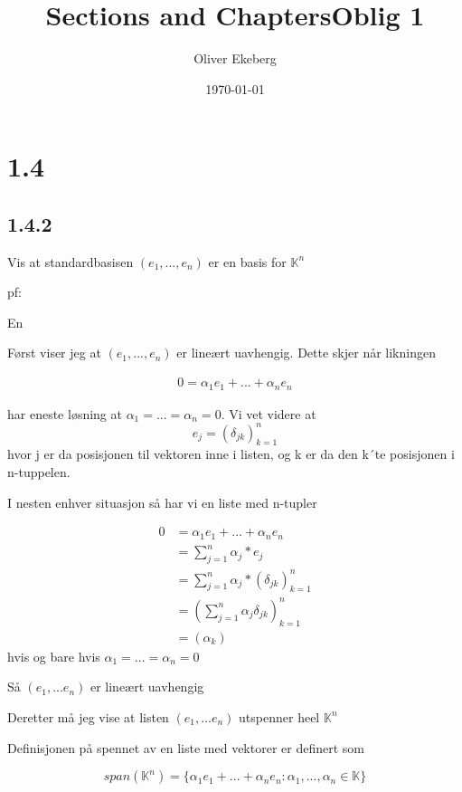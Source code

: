\documentclass[11pt]{article}
\title{Sections and Chapters}
\title{Oblig 1}
\author{Oliver Ekeberg}
\date{\today}
\begin{document}
\maketitle


\tableofcontents


\section{1.4}

\subsection{1.4.2}

Vis at standardbasisen $(e_1, ..., e_n)$ er en basis for $\mathbb{K}^n$

pf:

En 

\vspace{1em}
Først viser jeg at $(e_1,...,e_n)$ er lineært uavhengig. Dette skjer når likningen

\begin{align*}
    0 = \alpha_1 e_1 + ... + \alpha_n e_n     
\end{align*}

har eneste løsning at $\alpha_1=...=\alpha_n=0$. Vi vet videre at $$e_j = (\delta_{jk})^{n}_{k=1}$$ hvor j er da posisjonen til 
vektoren inne i listen, og k er da den k´te posisjonen i n-tuppelen. 

I nesten enhver situasjon så har vi en liste med n-tupler

\begin{align*}
    0 &= \alpha_1 e_1 + ... + \alpha_n e_n \\
    &= \sum_{j=1}^{n} \alpha_j * e_j \\
    &= \sum_{j=1}^{n} \alpha_j * (\delta_{jk})^{n}_{k=1} \\
    &= (\sum_{j=1}^{n} \alpha_j \delta_{jk})^n_{k=1} \\
    &= (\alpha_k)
\end{align*}
hvis og bare hvis $\alpha_1= ... = \alpha_n = 0$  

Så $(e_1,...e_n)$ er lineært uavhengig

\vspace{1em}
Deretter må jeg vise at listen $(e_1,...e_n)$ utspenner heel $\mathbb{K}^n$

Definisjonen på spennet av en liste med vektorer er definert som

$$
span(\mathbb{K}^n) = \{ \alpha_1 e_1 + ... + \alpha_n e_n  : \alpha_1,...,\alpha_n \in \mathbb{K} \}
$$
\end{document}
